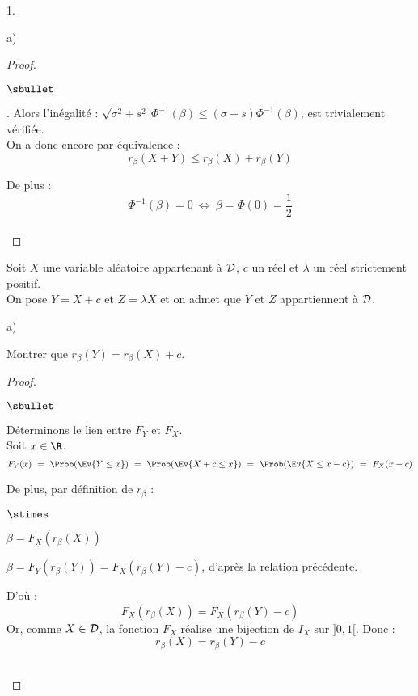 \documentclass[11pt]{article}%
\begin{document}
\begin{noliste}{1.}
\begin{noliste}{a)}
\begin{proof}
\begin{noliste}{$\sbullet$}
	\item {}. Alors 
	l'inégalité : $\sqrt{\sigma^2+s^2} \ \Phi^{-1}(\beta)
	\leq (\sigma +s) \Phi^{-1}(\beta)$, est trivialement vérifiée.\\
	On a donc encore par équivalence :
	\[
	  r_{\beta}(X+Y) \leq r_{\beta}(X) + r_{\beta}(Y)
	\]
      \end{noliste}
      De plus :
	\[
	  \Phi^{-1}(\beta) =0 \ \Leftrightarrow \ \beta=
	  \Phi(0)=\dfrac{1}{2}
	\]
      ~\\[-1.2cm]
    \end{proof}
  \end{noliste}
  
  \item Soit $X$ une variable aléatoire appartenant à ${\cal D}$, 
  $c$ un réel et $\lambda$ un réel strictement positif.\\
  On pose $Y=X+c$ et $Z=\lambda X$ et on admet que $Y$ et $Z$ 
  appartiennent à ${\cal D}$.
  \begin{noliste}{a)}
    \setlength{\itemsep}{2mm}
    \item Montrer que $r_\beta(Y)=r_\beta(X)+c$.
    
    \begin{proof}~
      \begin{noliste}{$\sbullet$}
	\item Déterminons le lien entre $F_Y$ et $F_X$.\\
	Soit $x\in \R$.
	\[
	  F_Y(x) \ = \ \Prob(\Ev{Y \leq x})
	  \ = \ \Prob(\Ev{X+c \leq x})
	  \ = \ \Prob(\Ev{X \leq x-c})
	  \ = \ F_X(x-c)
	\]
	\item De plus, par définition de $r_\beta$ :
	\begin{noliste}{$\stimes$}
	  \item $\beta = F_X(r_\beta(X))$
	  \item $\beta = F_Y(r_\beta(Y))=F_X(r_\beta(Y)-c)$, 
	  d'après la relation précédente.
	\end{noliste}
	D'où :
	\[
	  F_X(r_\beta(X)) = F_X(r_\beta(Y)-c)
	\]
	Or, comme $X\in {\cal D}$, la fonction $F_X$ réalise 
	une bijection de $I_X$ sur $]0,1[$. Donc :
	\[
	  r_\beta(X) = r_\beta(Y)-c
	\]
      \end{noliste}
      ~\\[-1cm]
    \end{proof}


\end{noliste}
\end{noliste}
\end{document}
